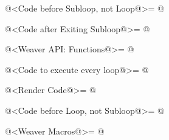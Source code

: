 \iniciocodigo
@<Code before Subloop, not Loop@>=
@
\fimcodigo

\iniciocodigo
@<Code after Exiting Subloop@>=
@
\fimcodigo

\iniciocodigo
@<Weaver API: Functions@>=
@
\fimcodigo

\iniciocodigo
@<Code to execute every loop@>=
@
\fimcodigo

\iniciocodigo
@<Render Code@>=
@
\fimcodigo

\iniciocodigo
@<Code before Loop, not Subloop@>=
@
\fimcodigo

\iniciocodigo
@<Weaver Macros@>=
@
\fimcodigo





\fim
